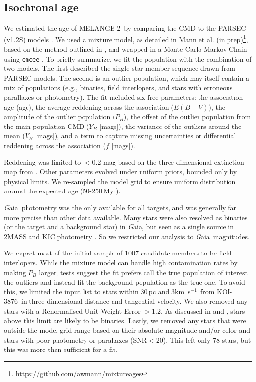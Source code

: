 \documentclass[twocolumn]{aastex631}
\newcommand{\starname}{KOI-3876}
\newcommand\kms{km~s$^{-1}$}
\newcommand{\gaia}{{\textit Gaia}}
\newcommand{\association}{MELANGE-2}
\begin{document}
\subsection{Isochronal age}

We estimated the age of \association\ by comparing the CMD to the PARSEC (v1.2S) models \citep{PARSEC}. We used a mixture model, as detailed in Mann et al. (in prep)\footnote{\url{https://github.com/awmann/mixtureages}}, based on the method outlined in \citet{HoggRecipes}, and wrapped in a Monte-Carlo Markov-Chain using \texttt{emcee} \citep{Foreman-Mackey2013}. To briefly summarize, we fit the population with the combination of two models. The first described the single-star member sequence drawn from PARSEC models. The second is an outlier population, which may itself contain a mix of populations (e.g., binaries, field interlopers, and stars with erroneous parallaxes or photometry). The fit included six free parameters: the association age (age), the average reddening across the association ($E(B-V)$), the amplitude of the outlier population ($P_B$), the offset of the outlier population from the main population CMD ($Y_B$ [mags]), the variance of the outliers around the mean ($V_B$ [mags]), and a term to capture missing uncertainties or differential reddening across the association ($f$ [mags]). 

Reddening was limited to $<0.2$ mag based on the three-dimensional extinction map from \citet{2019ApJ...887...93G}. Other parameters evolved under uniform priors, bounded only by physical limits. We re-sampled the model grid to ensure uniform distribution around the expected age (50-250\,Myr). 

\gaia\ photometry was the only available for all targets, and was generally far more precise than other data available. Many stars were also resolved as binaries (or the target and a background star) in \gaia, but seen as a single source in 2MASS and KIC photometry \citep{Brown2011}. So we restricted our analysis to \gaia\ magnitudes. 

We expect most of the initial sample of 1007 candidate members to be field interlopers. While the mixture model can handle high contamination rates by making $P_B$ larger,  tests suggest the fit prefers call the true population of interest the outliers and instead fit the background population as the true one. To avoid this, we limited the input list to stars within 30\,pc and 3\kms\ from \starname\ in three-dimensional distance and tangential velocity. We also removed any stars with a Renormalised Unit Weight Error \citep[RUWE; ][]{GaiaEDR3} $>1.2$. As discussed in \citet{Ziegler2020} and \citet{2021arXiv210609040W}, stars above this limit are likely to be binaries. Lastly, we removed any stars that were outside the model grid range based on their absolute magnitude and/or color and stars with poor photometry or parallaxes (SNR$<$20). This left only 78 stars, but this was more than sufficient for a fit.%
\end{document}
